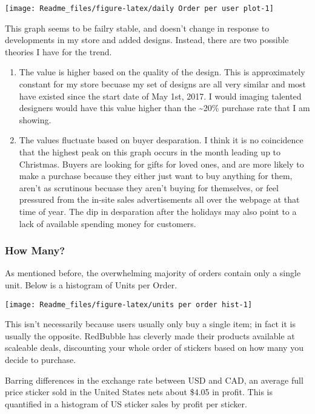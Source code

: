 \documentclass[]{article}
\begin{document}
\begin{center}\texttt{[image: Readme\_files/figure-latex/daily Order per user plot-1]} \end{center}

This graph seems to be failry stable, and doesn't change in response to
developments in my store and added designs. Instead, there are two
possible theories I have for the trend.

\begin{enumerate}
\def\labelenumi{\arabic{enumi}.}
\item
  The value is higher based on the quality of the design. This is
  approximately constant for my store becuase my set of designs are all
  very similar and most have existed since the start date of May 1st,
  2017. I would imaging talented designers would have this value higher
  than the \textasciitilde{}20\% purchase rate that I am showing.
\item
  The values fluctuate based on buyer desparation. I think it is no
  coincidence that the highest peak on this graph occurs in the month
  leading up to Christmas. Buyers are looking for gifts for loved ones,
  and are more likely to make a purchase because they either just want
  to buy anything for them, aren't as scrutinous becuase they aren't
  buying for themselves, or feel pressured from the in-site sales
  advertisements all over the webpage at that time of year. The dip in
  desparation after the holidays may also point to a lack of available
  spending money for customers.
\end{enumerate}

\subsubsection{How Many?}\label{how-many}

As mentioned before, the overwhelming majority of orders contain only a
single unit. Below is a histogram of Units per Order.

\begin{center}\texttt{[image: Readme\_files/figure-latex/units per order hist-1]} \end{center}

This isn't necessarily because users usually only buy a single item; in
fact it is usually the opposite. RedBubble has cleverly made their
products available at scaleable deals, discounting your whole order of
stickers based on how many you decide to purchase.

Barring differences in the exchange rate between USD and CAD, an average
full price sticker sold in the United States nets about \$4.05 in
profit. This is quantified in a histogram of US sticker sales by profit
per sticker.
\end{document}
